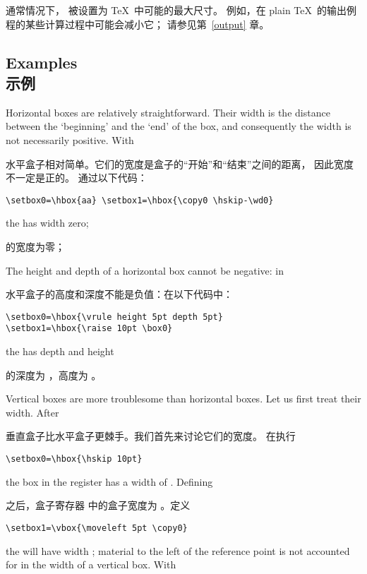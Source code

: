 通常情况下， 被设置为 \TeX\ 中可能的最大尺寸。
例如，在 plain \TeX\ 的输出例程的某些计算过程中可能会减小它；
请参见第~\ref{output} 章。


\subsection{Examples\\示例}

Horizontal boxes are relatively straightforward. Their width is the
distance between the `beginning' and the `end' of the
box, 
and consequently the width is not necessarily positive.
With

水平盒子相对简单。它们的宽度是盒子的“开始”和“结束”之间的距离，
因此宽度不一定是正的。
通过以下代码：
\begin{verbatim}
\setbox0=\hbox{aa} \setbox1=\hbox{\copy0 \hskip-\wd0}
\end{verbatim}
the  has width zero;

 的宽度为零；
The height and depth of a horizontal box cannot be negative: in

水平盒子的高度和深度不能是负值：在以下代码中：
\begin{verbatim}
\setbox0=\hbox{\vrule height 5pt depth 5pt}
\setbox1=\hbox{\raise 10pt \box0}
\end{verbatim}
the  has depth \n{0pt} and height~\n{15pt}

 的深度为 \n{0pt}，高度为 \n{15pt}。

Vertical boxes are more troublesome than horizontal boxes.
Let us first treat their width.
After 

垂直盒子比水平盒子更棘手。我们首先来讨论它们的宽度。
在执行
\begin{verbatim}
\setbox0=\hbox{\hskip 10pt}
\end{verbatim}
the box in the
 register has a width of \n{10pt}. Defining

之后，盒子寄存器  中的盒子宽度为 \n{10pt}。定义
\begin{verbatim}
\setbox1=\vbox{\moveleft 5pt \copy0}
\end{verbatim}
\awp
the  will have width \n{5pt}; material to the
left of the reference point is not accounted for in the
width of a vertical box. With

